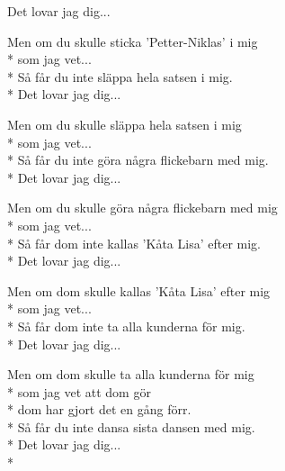 \begin{SongText}
\begin{SongVerse}
        Det lovar jag dig...
    \end{SongVerse}
    \begin{SongVerse}
        Men om du skulle sticka 'Petter-Niklas' i mig\\*%
        som jag vet...\\*%
        Så får du inte släppa hela satsen i mig.\\*%
        Det lovar jag dig...
    \end{SongVerse}
    \begin{SongVerse}
        Men om du skulle släppa hela satsen i mig\\*%
        som jag vet...\\*%
        Så får du inte göra några flickebarn med mig.\\*%
        Det lovar jag dig...
    \end{SongVerse}
    \begin{SongVerse}
        Men om du skulle göra några flickebarn med mig\\*%
        som jag vet...\\*%
        Så får dom inte kallas 'Kåta Lisa' efter mig.\\*%
        Det lovar jag dig...
    \end{SongVerse}
    \begin{SongVerse}
        Men om dom skulle kallas 'Kåta Lisa' efter mig\\*%
        som jag vet...\\*%
        Så får dom inte ta alla kunderna för mig.\\*%
        Det lovar jag dig...
    \end{SongVerse}
    \begin{SongVerse}
        Men om dom skulle ta alla kunderna för mig\\*%
        som jag vet att dom gör\\*%
        dom har gjort det en gång förr.\\*%
        Så får du inte dansa sista dansen med mig.\\*%
        Det lovar jag dig...\\*%
    \end{SongVerse}
\end{SongText}